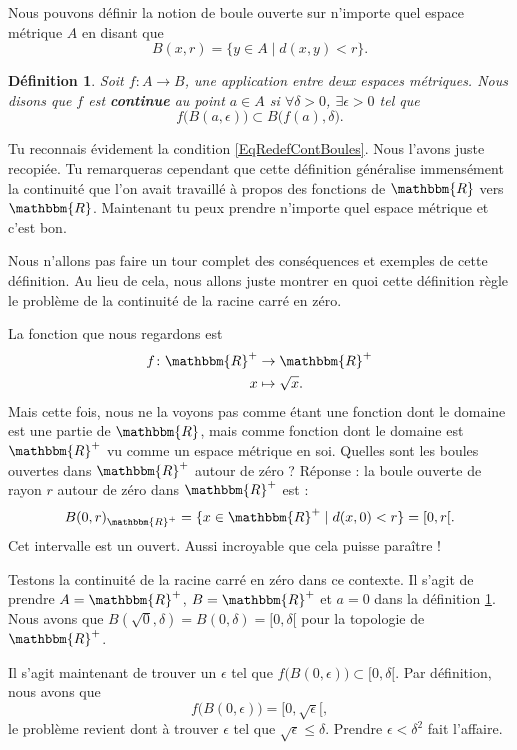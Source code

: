 \documentclass[a4paper,12pt]{book}
\newcommand{\eR}{\mathbbm{R}}
\newcounter{numtho}
\theoremstyle{mes_exemples}	\newtheorem{exemple}[numtho]{Exemple}
\theoremstyle{mes_tho}
\newtheorem{definition}[numtho]{Définition}
\newcommand{\defe}[2]{\textbf{#1}\index{#2}}
\newcommand{\tq}{\mid}
\begin{document}
Nous pouvons définir la notion de boule ouverte sur n'importe quel espace métrique $A$ en disant que
\[ 
  B(x,r)=\{ y\in A\tq d(x,y)<r \}.
\]
\begin{definition}		\label{DefContMetrique}
Soit $f\colon A\to B$, une application entre deux espaces métriques. Nous disons que $f$ est \defe{continue}{Continue!sur espace métrique} au point $a\in A$ si $\forall \delta>0$, $\exists\epsilon>0$ tel que 
\begin{equation}
  f\big( B(a,\epsilon) \big)\subset B\big( f(a),\delta \big).
\end{equation}
\end{definition}
Tu reconnais évidement la condition \eqref{EqRedefContBoules}. Nous l'avons juste recopiée. Tu remarqueras cependant que cette définition généralise immensément la continuité que l'on avait travaillé à propos des fonctions de $\eR$ vers $\eR$. Maintenant tu peux prendre n'importe quel espace métrique et c'est bon.

Nous n'allons pas faire un tour complet des conséquences et exemples de cette définition. Au lieu de cela, nous allons juste montrer en quoi cette définition règle le problème de la continuité de la racine carré en zéro.

La fonction que nous regardons est 
\begin{equation}
\begin{aligned}
f \colon \eR^+&\to \eR^+ \\ 
   x&\mapsto \sqrt{x}.
\end{aligned}
\end{equation}
Mais cette fois, nous ne la voyons pas comme étant une fonction dont le domaine est une partie de $\eR$, mais comme fonction dont le domaine est $\eR^+$ vu comme un espace métrique en soi. Quelles sont les boules ouvertes dans $\eR^+$ autour de zéro ? Réponse : la boule ouverte de rayon $r$ autour de zéro dans $\eR^+$ est :
\[ 
  B(0,r)_{\eR^+}=\{ x\in\eR^+\tq d(x,0)<r \}=[0,r[.  
\]
Cet intervalle est un ouvert. Aussi incroyable que cela puisse paraître !

Testons la continuité de la racine carré en zéro dans ce contexte. Il s'agit de prendre $A=\eR^+$, $B=\eR^+$ et $a=0$ dans la définition \ref{DefContMetrique}. Nous avons que $B(\sqrt{0},\delta)=B(0,\delta)=[0,\delta[$ pour la topologie de $\eR^+$.

Il s'agit maintenant de trouver un $\epsilon$ tel que $f\big( B(0,\epsilon) \big)\subset [0,\delta[$. Par définition, nous avons que
\[ 
  f\big( B(0,\epsilon) \big)=[0,\sqrt{\epsilon}[,
\]
le problème revient dont à trouver $\epsilon$ tel que $\sqrt{\epsilon}\leq\delta$. Prendre $\epsilon<\delta^2$ fait l'affaire.
\end{document}
